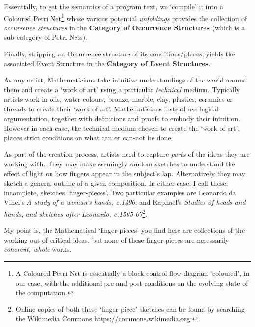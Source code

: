 Essentially, to get the semantics of a program text, we `compile' it into a
Coloured Petri Net\footnote{A Coloured Petri Net is essentially a block control
flow diagram `coloured', in our case, with the additional pre and post
conditions on the evolving state of the computation.} whose various potential
\emph{unfoldings} provides the collection of \emph{occurrence structures} in the
\textbf{Category of Occurrence Structures} (which is a sub-category of Petri
Nets).

Finally, stripping an Occurrence structure of its conditions/places, yields the
associated Event Structure in the \textbf{Category of Event Structures}.


As any artist, Mathematicians take intuitive understandings of the world around
them and create a `work of art' using a particular \emph{technical} medium.
Typically artists work in oils, water colours, bronze, marble, clay, plastics,
ceramics or threads to create their `work of art'. Mathematicians instead use
logical argumentation, together with definitions and proofs to embody their
intuition. However in each case, the technical medium chosen to create the `work
of art', places strict conditions on what can or can-not be done.

As part of the creation process, artists need to capture \emph{parts} of the
ideas they are working with. They may make seemingly random sketches to
understand the effect of light on how fingers appear in the subject's lap.
Alternatively they may sketch a general outline of a given composition. In
either case, I call these, incomplete, sketches `finger-pieces'. Two particular
examples are Leonardo da Vinci's \emph{A study of a woman's hands, c.1490}, and
Raphael's \emph{Studies of heads and hands, and sketches after Leonardo,
c.1505-07}\footnote{Online copies of both these `finger-piece' sketches can be
found by searching the Wikimedia Commons https://commons.wikimedia.org.}.

My point is, the Mathematical `finger-pieces' you find here are collections of
the working out of critical ideas, but none of these finger-pieces are
necessarily \emph{coherent, whole} works. 

